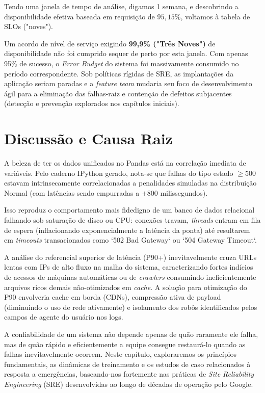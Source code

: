 \documentclass[12pt,a4paper,twoside]{report}
\begin{document}
Tendo uma janela de tempo de análise, digamos 1 semana, e descobrindo a disponibilidade efetiva baseada em requisição de $95,15\%$, voltamos à tabela de SLOs ("noves").

Um acordo de nível de serviço exigindo \textbf{99,9\% ("Três Noves")} de disponibilidade não foi cumprido sequer de perto por esta janela. Com apenas 95\% de sucesso, o \textit{Error Budget} do sistema foi massivamente consumido no período correspondente. Sob políticas rígidas de SRE, as implantações da aplicação seriam paradas e a \textit{feature team} mudaria seu foco de desenvolvimento ágil para a eliminação das falhas-raiz e contenção de defeitos subjacentes (detecção e prevenção explorados nos capítulos iniciais).

\section{Discussão e Causa Raiz}

A beleza de ter os dados unificados no Pandas está na correlação imediata de variáveis. Pelo caderno IPython gerado, nota-se que falhas do tipo estado $\geq 500$ estavam intrinsecamente correlacionadas a penalidades simuladas na distribuição Normal (com latências sendo empurradas a $+800$ milissegundos).

Isso reproduz o comportamento mais fidedigno de um banco de dados relacional falhando sob saturação de disco ou CPU: conexões travam, \textit{threads} entram em fila de espera (inflacionando exponencialmente a latência da ponta) até resultarem em \textit{timeouts} transacionados como `502 Bad Gateway` ou `504 Gateway Timeout`.

A análise do referencial superior de latência (P90+) inevitavelmente cruza URLs lentas com IPs de alto fluxo na malha do sistema, caracterizando fortes indícios de acessos de máquinas automáticas ou de \textit{crawlers} consumindo ineficientemente arquivos ricos demais não-otimizados em \textit{cache}. A solução para otimização do P90 envolveria cache em borda (CDNs), compressão ativa de payload (diminuindo o uso de rede ativamente) e isolamento dos robôs identificados pelos campos de agente do usuário nos logs.


A confiabilidade de um sistema não depende apenas de quão raramente ele falha, mas de quão rápido e eficientemente a equipe consegue restaurá-lo quando as falhas inevitavelmente ocorrem. Neste capítulo, exploraremos os princípios fundamentais, as dinâmicas de treinamento e os estudos de caso relacionados à resposta a emergências, baseando-nos fortemente nas práticas de \textit{Site Reliability Engineering} (SRE) desenvolvidas ao longo de décadas de operação pelo Google.
\end{document}
